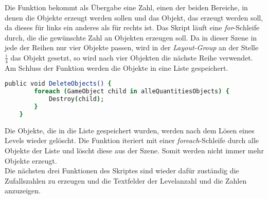 Die Funktion bekommt als Übergabe eine Zahl, einen der beiden Bereiche, in denen die Objekte erzeugt werden sollen und das Objekt, das erzeugt werden soll, da dieses für links ein anderes als für rechts ist. Das Skript läuft eine \textit{for}-Schleife durch, die die gewünschte Zahl an Objekten erzeugen soll. Da in dieser Szene in jede der Reihen nur vier Objekte passen, wird in der \textit{Layout-Group} an der Stelle $\frac{i}{4}$ das Objekt gesetzt, so wird nach vier Objekten die nächste Reihe verwendet. Am Schluss der Funktion werden die Objekte in eine Liste gespeichert.\\
\begin{lstlisting}[language=csh, caption={GameQuantities.cs Delete-Funktion}]
	public void DeleteObjects() {
		foreach (GameObject child in alleQuantitiesObjects) {
			Destroy(child);
		}
	}
\end{lstlisting}
Die Objekte, die in die Liste gespeichert wurden, werden nach dem Lösen eines Levels wieder gelöscht. Die Funktion iteriert mit einer \textit{foreach}-Schleife durch alle Objekte der Liste und löscht diese aus der Szene. Somit werden nicht immer mehr Objekte erzeugt.\\

Die nächsten drei Funktionen des Skriptes sind wieder dafür zuständig die Zufallszahlen zu erzeugen und die Textfelder der Levelanzahl und die Zahlen anzuzeigen.\\

